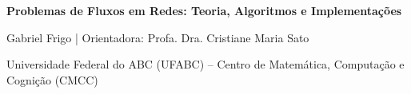 \documentclass[12pt,a4paper]{article}
\begin{document}
\setlength{\emergencystretch}{3em}
\onehalfspacing

\begin{center}
    {\LARGE\textbf{Problemas de Fluxos em Redes: Teoria, Algoritmos e Implementações}\par}
    \vspace{0.4em}
    {\large Gabriel Frigo \quad | \quad Orientadora: Profa. Dra. Cristiane Maria Sato\par}
    \vspace{0.2em}
    {\small Universidade Federal do ABC (UFABC) -- Centro de Matemática, Computação e Cognição (CMCC)\par}
\end{center}
\vspace{0.6em}

\apendicecodigotrue

\end{document}
